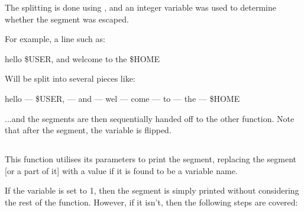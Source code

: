 \documentclass[12pt, a4paper]{report}
\begin{document}
                The splitting is done using , and an integer variable
                 was used to determine whether the segment was escaped.

                For example, a line such as:

                \begin{center}
                    hello \$USER, and wel\quot come to the \$HOME\quot
                \end{center}
                
                Will be split into several pieces like:

                \begin{center}
                    hello --- \$USER, --- and --- wel --- come --- to --- the --- \$HOME
                \end{center}

                ...and the segments are then sequentially handed off to the other function.
                Note that after the  segment, the  variable is flipped.

                \clearpage
            
            \subsection{}
                This function utilises its parameters to print the segment,
                replacing the segment [or a part of it] with a value if it
                is found to be a variable name.

                If the  variable is set to 1, then the segment is
                simply printed without considering the rest of the function.
                However, if it isn't, then the following steps are covered:
\end{document}
